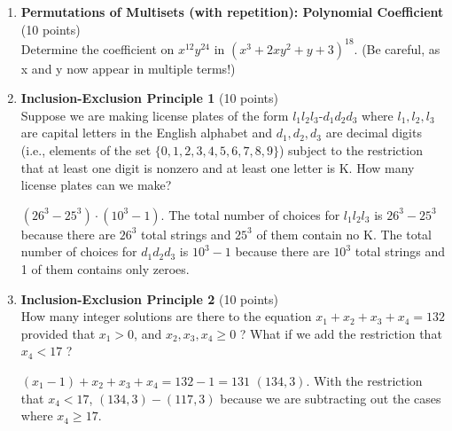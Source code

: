 \begin{enumerate}
  \item \textbf{Permutations of Multisets (with repetition): Polynomial Coefficient} (10 points)\\
  Determine the coefficient on $x^{12} y^{24}$ in $(x^3+2xy^2+y+3)^{18}$. (Be careful, as x and y now appear in multiple terms!)
  \begin{subanswer}
  \end{subanswer}












  \newpage

  \item \textbf{Inclusion-Exclusion Principle 1} (10 points)\\
  Suppose we are making license plates of the form $l_1 l_2 l_3$-$d_1 d_2 d_3$ where 
  $l_1,l_2,l_3$ are capital letters in the English alphabet and $d_1,d_2,d_3$ are decimal 
  digits (i.e., elements of the set $\{0,1,2,3,4,5,6,7,8,9\}$) subject to the restriction 
  that at least one digit is nonzero and at least one letter is K. How many license 
  plates can we make?
  \begin{subanswer}
    $(26^3-25^3) \cdot (10^3-1)$. The total number of choices for $l_1 l_2 l_3$ is $26^3-25^3$ 
    because there are $26^3$ total strings and $25^3$ of them contain no K. The total 
    number of choices for $d_1 d_2 d_3$ is $10^3-1$ because there are $10^3$ total strings 
    and 1 of them contains only zeroes.
  \end{subanswer}



  \item \textbf{Inclusion-Exclusion Principle 2} (10 points)\\
  How many integer solutions are there to the equation
  $x_1+x_2+x_3+x_4=132$
  provided that $x_1>0$, and $x_2,x_3,x_4 \geq 0$ ? What if we add the restriction that $x_4<17$ ?
  \begin{subanswer}
    $(x_1-1)+x_2+x_3+x_4=132-1=131$
    $(134,3)$. With the restriction that $x_4<17$, $(134,3)-(117,3)$ because we are subtracting out the cases where $x_4 \geq 17$.
  \end{subanswer}


\end{enumerate}

